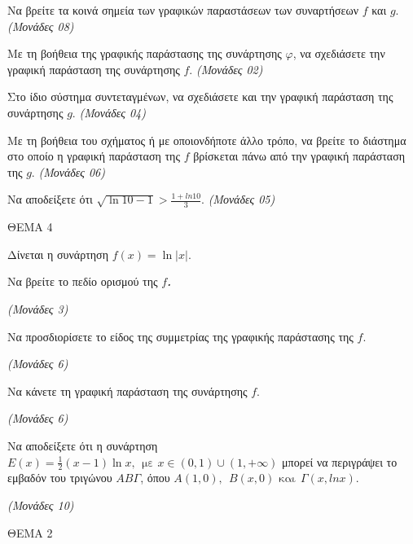 \documentclass[11pt,a4paper,twoside]{book}
\newcommand{\monades}[1]{\hfill \textit{(Μονάδες #1)}}
\begin{document}
\begin{alist}
\item Να βρείτε τα κοινά σημεία των γραφικών παραστάσεων των συναρτήσεων $f$ και $g$.
\monades{08}

\item Με τη βοήθεια της γραφικής παράστασης της συνάρτησης $\varphi$, να σχεδιάσετε την γραφική παράσταση της συνάρτησης $f$.
\monades{02}

\item Στο ίδιο σύστημα συντεταγμένων, να σχεδιάσετε και την γραφική παράσταση της συνάρτησης $g$.
\monades{04}

\item Με τη βοήθεια του σχήματος ή με οποιονδήποτε άλλο τρόπο, να βρείτε το διάστημα στο οποίο η γραφική παράσταση της $f$ βρίσκεται πάνω από την γραφική παράσταση της $g$.
\monades{06}

\item Να αποδείξετε ότι $\sqrt{\ln 10 - 1} > \frac{1 + ln10}{3}$.
\monades{05}
\end{alist}

\vspace{4mm}

ΘΕΜΑ 4

Δίνεται η συνάρτηση $f(x) = \ln|x|$.

\begin{alist}
\item Να βρείτε το πεδίο ορισμού της $f$\emph{\textbf{.}}

\monades{3}

\item Να προσδιορίσετε το είδος της συμμετρίας της γραφικής παράστασης της $f$.

\monades{6}

\item Να κάνετε τη γραφική παράσταση της συνάρτησης $f$.

\monades{6}

\item Να αποδείξετε ότι η συνάρτηση $Ε(x) = \frac{1}{2}(x - 1)\ln x,\ \ \text{με  }x \in (0,1) \cup (1, + \infty)$ μπορεί να περιγράψει το εμβαδόν του τριγώνου $ΑΒ\Gamma$, όπου $Α(1,0),\ \ B(x,0)\text{  και}\ \ \Gamma(x,lnx)$.

\monades{10}
\end{alist}

\vspace{4mm}

ΘΕΜΑ 2
\end{document}
